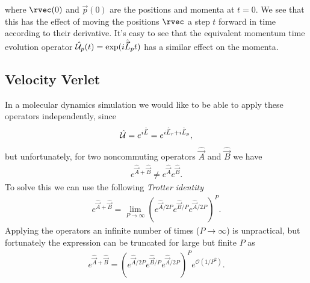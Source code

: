 where $\rvec(0)$ and $\vec p(0)$ are the positions and momenta at $t = 0$. We see that this has the effect of moving the positions $\rvec$ a step $t$ forward in time according to their derivative. It's easy to see that the equivalent momentum time evolution operator $\hat{\mathcal{U}}_p(t) = \exp(i\hat{\vec L}_p t)$ has a similar effect on the momenta. 

\subsection{Velocity Verlet}
In a molecular dynamics simulation we would like to be able to apply these operators independently, since
\begin{align*}
    \hat{\mathcal{U}} = e^{i\hat{\vec L}} = e^{i\hat{\vec L}_r + i\hat{\vec L}_p},
\end{align*}
but unfortunately, for two noncommuting operators $\hat {\vec A}$ and $\hat {\vec B}$ we have
\begin{align*}
    e^{\hat {\vec A} + \hat {\vec B}} \neq e^{\hat {\vec A}} e^{\hat {\vec B}}.
\end{align*}
To solve this we can use the following \emph{Trotter identity}
\begin{align*}
    e^{\hat {\vec A} + \hat {\vec B}} = \lim_{P\rightarrow \infty} \left( e^{\hat {\vec A}/2P} e^{\hat {\vec B}/P} e^{\hat {\vec A}/2P} \right)^P.
\end{align*}
Applying the operators an infinite number of times ($P\rightarrow \infty$) is unpractical, but fortunately the expression can be truncated for large but finite $P$ as
\begin{align}
    e^{\hat {\vec A} + \hat {\vec B}} = \left( e^{\hat {\vec A}/2P} e^{\hat {\vec B}/P} e^{\hat {\vec A}/2P} \right)^P e^{\mathcal{O}(1/P^2)}.
    \label{eq:liou_time_exact}
\end{align}

